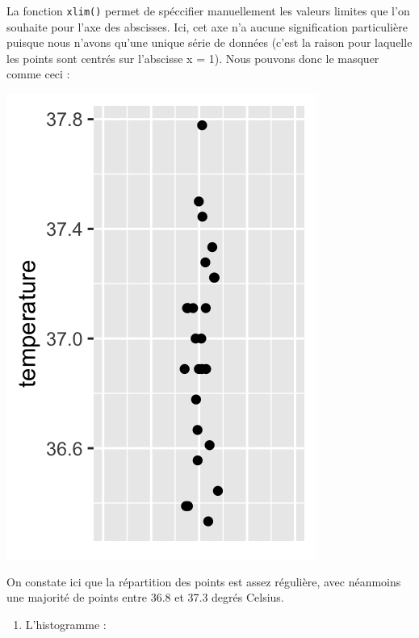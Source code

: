 \documentclass[a4paperpaper,]{article}
\newenvironment{Shaded}{\begin{snugshade}}{\end{snugshade}}
\newcommand{\DataTypeTok}[1]{\textcolor[rgb]{0.00,0.34,0.68}{#1}}
\newcommand{\DecValTok}[1]{\textcolor[rgb]{0.69,0.50,0.00}{#1}}
\newcommand{\FloatTok}[1]{\textcolor[rgb]{0.69,0.50,0.00}{#1}}
\newcommand{\KeywordTok}[1]{\textcolor[rgb]{0.12,0.11,0.11}{\textbf{#1}}}
\newcommand{\NormalTok}[1]{\textcolor[rgb]{0.12,0.11,0.11}{#1}}
\newcommand{\OperatorTok}[1]{\textcolor[rgb]{0.12,0.11,0.11}{#1}}
\newcommand{\StringTok}[1]{\textcolor[rgb]{0.75,0.01,0.01}{#1}}
\providecommand{\tightlist}{%
  \setlength{\itemsep}{0pt}\setlength{\parskip}{0pt}}
\begin{document}
La fonction \texttt{xlim()} permet de spéccifier manuellement les valeurs limites que l'on souhaite pour l'axe des abscisses. Ici, cet axe n'a aucune signification particulière puisque nous n'avons qu'une unique série de données (c'est la raison pour laquelle les points sont centrés sur l'abscisse x = 1). Nous pouvons donc le masquer comme ceci :

\begin{Shaded}
\end{Shaded}

\begin{center}\includegraphics[width=0.25\linewidth]{figure/unnamed-chunk-17-1} \end{center}

On constate ici que la répartition des points est assez régulière, avec néanmoins une majorité de points entre 36.8 et 37.3 degrés Celsius.

\begin{enumerate}
\def\labelenumi{\arabic{enumi}.}
\setcounter{enumi}{1}
\tightlist
\item
  L'histogramme :
\end{enumerate}
\end{document}
